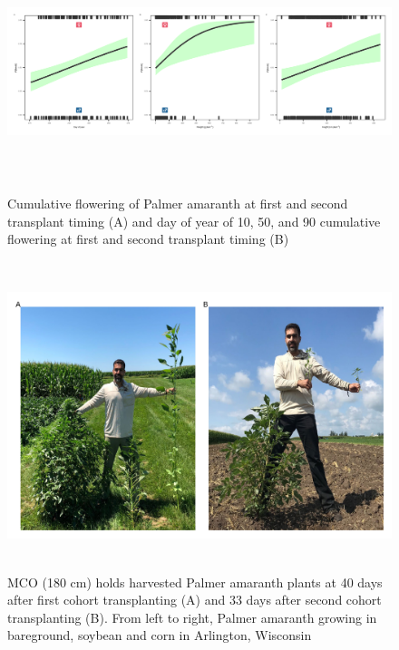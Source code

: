 \documentclass[utf8]{frontiersSCNS}
\begin{document}
\begin{figure}

{\centering \includegraphics[width=170mm,height=70mm]{../data analysis/figures/Figure 5} 

}

\caption{Cumulative flowering of Palmer amaranth at first and second transplant timing (A) and day of year of 10, 50, and 90 cumulative flowering at first and second transplant timing (B)}\label{fig:Figure-5}
\end{figure}

\begin{figure}

{\centering \includegraphics[width=150mm,height=90mm]{../data analysis/figures/Figure 6} 

}

\caption{MCO (180 cm) holds harvested Palmer amaranth plants at 40 days after first cohort transplanting (A) and 33 days after second cohort transplanting (B). From left to right, Palmer amaranth growing in bareground, soybean and corn in Arlington, Wisconsin}\label{fig:Figure-6}
\end{figure}
\end{document}
